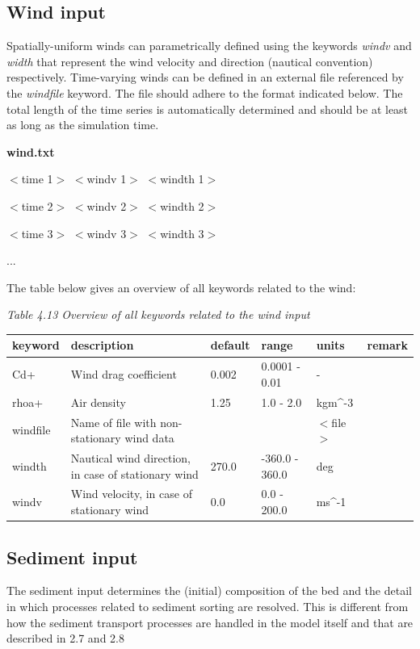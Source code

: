 \documentclass{article}
\begin{document}
\subsection{ Wind input}

\noindent Spatially-uniform winds can parametrically defined using the keywords \textit{windv} and \textit{width} that represent the wind velocity and direction (nautical convention) respectively. Time-varying winds can be defined in an external file referenced by the \textit{windfile} keyword. The file should adhere to the format indicated below. The total length of the time series is automatically determined and should be at least as long as the simulation time.

\noindent \textbf{wind.txt}

\noindent $<$time 1$>$ $<$windv 1$>$ $<$windth 1$>$

\noindent $<$time 2$>$ $<$windv 2$>$ $<$windth 2$>$

\noindent $<$time 3$>$ $<$windv 3$>$ $<$windth 3$>$

\noindent ...

\noindent The table below gives an overview of all keywords related to the wind:

\noindent \textit{Table 4.13 Overview of all keywords related to the wind input}

\begin{tabular}{|p{0.7in}|p{1.0in}|p{0.6in}|p{0.7in}|p{0.5in}|p{0.6in}|} \hline 
keyword & description & default & range & units & remark \\ \hline 
Cd+ & Wind drag coefficient & 0.002 & 0.0001 - 0.01 & - &  \\ \hline 
rhoa+ & Air density & 1.25 & 1.0 - 2.0 & kgm\^{}-3 &  \\ \hline 
windfile & Name of file with non-stationary wind data &  &  & $<$file$>$ &  \\ \hline 
windth & Nautical wind direction, in case of stationary wind & 270.0 & -360.0 - 360.0 & deg &  \\ \hline 
windv & Wind velocity, in case of stationary wind & 0.0 & 0.0 - 200.0 & ms\^{}-1 &  \\ \hline 
\end{tabular}


\subsection{ Sediment input}

\noindent The sediment input determines the (initial) composition of the bed and the detail in which processes related to sediment sorting are resolved. This is different from how the sediment transport processes are handled in the model itself and that are described in 2.7 and 2.8
\end{document}
